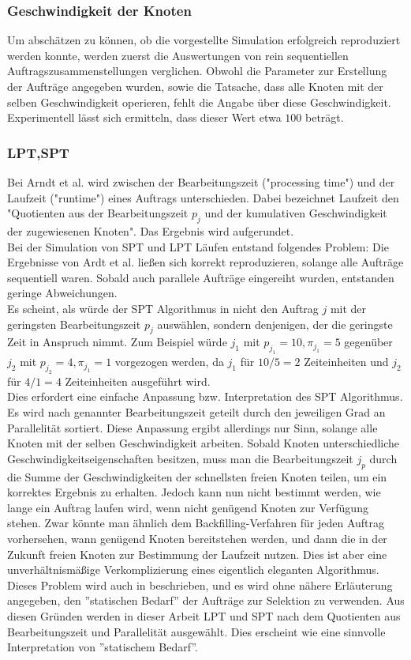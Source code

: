 \subsubsection{Geschwindigkeit der Knoten}
Um abschätzen zu können, ob die vorgestellte Simulation erfolgreich reproduziert werden konnte, werden zuerst die Auswertungen von rein sequentiellen Auftragszusammenstellungen verglichen. Obwohl die Parameter zur Erstellung der Aufträge angegeben wurden, sowie die Tatsache, dass alle Knoten mit der selben Geschwindigkeit operieren, fehlt die Angabe über diese Geschwindigkeit. Experimentell lässt sich ermitteln, dass dieser Wert etwa $100$ beträgt.

\subsubsection{LPT,SPT}
\label{spt-lpt-time}
Bei Arndt et al. \cite{Arn99} wird zwischen der Bearbeitungszeit ("processing time") und der Laufzeit ("runtime") eines Auftrags unterschieden. Dabei bezeichnet Laufzeit den "Quotienten aus der Bearbeitungszeit $p_j$ und der kumulativen Geschwindigkeit der zugewiesenen Knoten". Das Ergebnis wird aufgerundet.\\
Bei der Simulation von SPT und LPT Läufen entstand folgendes Problem: Die Ergebnisse von Ardt et al. \cite{Arn99} ließen sich korrekt reproduzieren, solange alle Aufträge sequentiell waren. Sobald auch parallele Aufträge eingereiht wurden, entstanden geringe Abweichungen.\\
Es scheint, als würde der SPT Algorithmus in \cite{Arn99} nicht den Auftrag $j$ mit der geringsten Bearbeitungszeit $p_j$ auswählen, sondern denjenigen, der die geringste Zeit in Anspruch nimmt. Zum Beispiel würde $j_1$ mit $p_{j_1} = 10, \pi_{j_1} = 5$ gegenüber $j_2$ mit $p_{j_2} = 4, \pi_{j_1} = 1$ vorgezogen werden, da $j_1$ für $10/5 = 2$  Zeiteinheiten und $j_2$ für $4/1 = 4$ Zeiteinheiten ausgeführt wird.\\
Dies erfordert eine einfache Anpassung bzw. Interpretation des SPT Algorithmus. Es wird nach genannter Bearbeitungszeit geteilt durch den jeweiligen Grad an Parallelität sortiert. Diese Anpassung ergibt allerdings nur Sinn, solange alle Knoten mit der selben Geschwindigkeit arbeiten. Sobald Knoten unterschiedliche Geschwindigkeitseigenschaften besitzen, muss man die Bearbeitungszeit $j_p$ durch die Summe der Geschwindigkeiten der schnellsten freien Knoten teilen, um ein korrektes Ergebnis zu erhalten. Jedoch kann nun nicht bestimmt werden, wie lange ein Auftrag laufen wird, wenn nicht genügend Knoten zur Verfügung stehen. Zwar könnte man ähnlich dem Backfilling-Verfahren für jeden Auftrag vorhersehen, wann genügend Knoten bereitstehen werden, und dann die in der Zukunft freien Knoten zur Bestimmung der Laufzeit nutzen. Dies ist aber eine unverhältnismäßige Verkomplizierung eines eigentlich eleganten Algorithmus.\\
Dieses Problem wird auch in \cite{Arn99} beschrieben, und es wird ohne nähere Erläuterung angegeben, den ''statischen Bedarf'' der Aufträge zur Selektion zu verwenden. Aus diesen Gründen werden in dieser Arbeit LPT und SPT nach dem Quotienten aus Bearbeitungszeit und Parallelität ausgewählt. Dies erscheint wie eine sinnvolle Interpretation von ''statischem Bedarf''.
